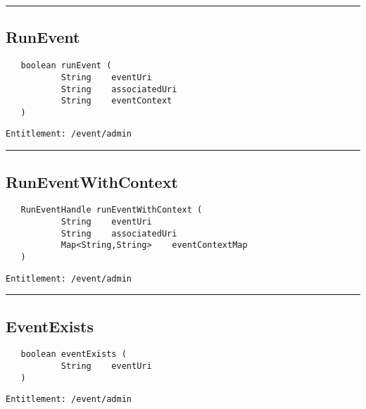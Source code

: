 \rule{12cm}{2pt}
\subsection{RunEvent}
\label{Api:RunEvent}
\begin{verbatim}
   boolean runEvent (
           String    eventUri
           String    associatedUri
           String    eventContext
   )
\end{verbatim}
\begin{Verbatim}[fontsize=\small, formatcom=\color{Maroon}]
  Entitlement: /event/admin
\end{Verbatim}



\rule{12cm}{2pt}
\subsection{RunEventWithContext}
\label{Api:RunEventWithContext}
\begin{verbatim}
   RunEventHandle runEventWithContext (
           String    eventUri
           String    associatedUri
           Map<String,String>    eventContextMap
   )
\end{verbatim}
\begin{Verbatim}[fontsize=\small, formatcom=\color{Maroon}]
  Entitlement: /event/admin
\end{Verbatim}



\rule{12cm}{2pt}
\subsection{EventExists}
\label{Api:EventExists}
\begin{verbatim}
   boolean eventExists (
           String    eventUri
   )
\end{verbatim}
\begin{Verbatim}[fontsize=\small, formatcom=\color{Maroon}]
  Entitlement: /event/admin
\end{Verbatim}



